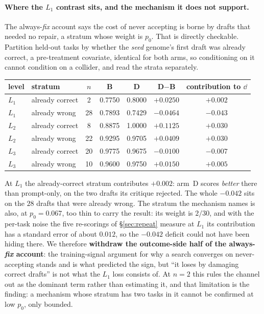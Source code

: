 \documentclass[11pt]{article}
\begin{document}
\paragraph{Where the $L_1$ contrast sits, and the mechanism it does not support.} The always-\emph{fix}
account says the cost of never accepting is borne by drafts that needed no repair, a stratum
whose weight is $p_0$. That is directly checkable. Partition held-out tasks by whether the
\emph{seed} genome's first draft was already correct, a pre-treatment covariate, identical
for both arms, so conditioning on it cannot condition on a collider, and read the strata
separately.

\begin{center}\small
\begin{tabular}{llccccc}
\toprule
level & stratum & $n$ & B & D & D$-$B & contribution to $\dd$ \\
\midrule
$L_1$ & already correct & 2  & 0.7750 & 0.8000 & $+0.0250$ & $\mathbf{+0.002}$ \\
$L_1$ & already wrong   & 28 & 0.7893 & 0.7429 & $-0.0464$ & $\mathbf{-0.043}$ \\
$L_2$ & already correct & 8  & 0.8875 & 1.0000 & $+0.1125$ & $+0.030$ \\
$L_2$ & already wrong   & 22 & 0.9295 & 0.9705 & $+0.0409$ & $+0.030$ \\
$L_3$ & already correct & 20 & 0.9775 & 0.9675 & $-0.0100$ & $-0.007$ \\
$L_3$ & already wrong   & 10 & 0.9600 & 0.9750 & $+0.0150$ & $+0.005$ \\
\bottomrule
\end{tabular}
\end{center}

At $L_1$ the already-correct stratum contributes $+0.002$: arm~D scores \emph{better} there
than prompt-only, on the two drafts its critique rejected. The whole $-0.042$ sits on the
$28$ drafts that were already wrong. The stratum the mechanism names is also, at $p_0 = 0.067$,
too thin to carry the result: its weight is $2/30$, and with the per-task noise the five
re-scorings of \S\ref{sec:repeat} measure at $L_1$ its contribution has a standard error of about
$0.012$, so the $-0.042$ deficit could not have been hiding there. We
therefore \textbf{withdraw the outcome-side half of the always-\emph{fix} account}: the
training-signal argument for why a search converges on never-accepting stands and is what
predicted the sign, but ``it loses by damaging correct drafts'' is not what the $L_1$ loss
consists of. At $n=2$ this rules the channel out as the dominant term rather than estimating
it, and that limitation is the finding: a mechanism whose stratum has two tasks in it cannot be
confirmed at low $p_0$, only bounded.
\end{document}
